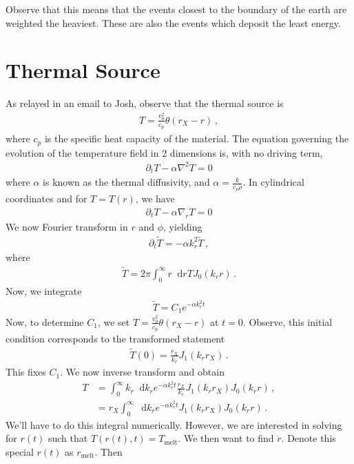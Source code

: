 \documentclass{article}
\newcommand*\diff{\mathop{}\!\mathrm{d}}
\newcommand*\te[1]{\text{#1}}
\newcommand*\f[2]{\frac{#1}{#2}}
\begin{document}
Observe that this means that the events closest to the boundary of the earth are weighted the heaviest. These are also the events which deposit the least energy.

\pagebreak
\section{Thermal Source}
As relayed in an email to Josh, observe that the thermal source is
\begin{align}
T = \f{v_0^2}{c_p}\theta(r_X-r)\,,
\end{align}
where $c_p$ is the specific heat capacity of the material. The equation governing the evolution of the temperature field in 2 dimensions is, with no driving term,
\begin{align}
\partial_t T - \alpha\nabla^2 T = 0
\end{align}
where $\alpha$ is known as the thermal diffusivity, and $\alpha=\f{k}{c_p\rho}$. In cylindrical coordinates and for $T = T(r)$, we have
\begin{align}
\partial_t T - \alpha\nabla_r T = 0
\end{align}
We now Fourier transform in $r$ and $\phi$, yielding
\begin{align}
\partial_t\tilde T =-\alpha k_r^2 \tilde T\,,
\end{align}
where
\begin{align}
\tilde T = 2\pi \int_0^\infty r \diff r  T J_0(k_r r)\,.
\end{align}
Now, we integrate
\begin{align}
\tilde T = C_1e^{-\alpha k_r^2 t}
\end{align}
Now, to determine $C_1$, we set $T = \f{v_0^2}{c_p}\theta(r_X-r)$ at $t = 0$. Observe, this initial condition corresponds to the transformed statement
\begin{align}
\tilde T(0) = \f{r_X}{k_r}J_1(k_r r_X)\,.
\end{align}
This fixes $C_1$. We now inverse transform and obtain
\begin{align}
T &= \int_0^\infty k_r\diff k_r e^{-\alpha k_r^2 t}\f{r_X}{k_r}J_1(k_r r_X) J_0(k_r r)\,,\\
&=r_X\int_0^\infty \diff k_r e^{-\alpha k_r^2 t} J_1(k_r r_X) J_0(k_r r)\,.
\end{align}
We'll have to do this integral numerically. However, we are interested in solving for $r(t)$ such that $T(r(t),t) = T_{\te{melt}}$. We then want to find $\dot r$. Denote this special $r(t)$ as $r_\te{melt}$. Then
\end{document}
